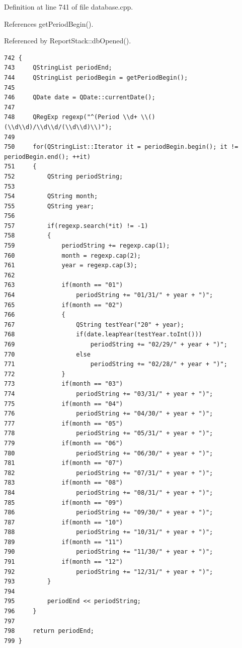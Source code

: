 Definition at line 741 of file database.cpp.

References get\-Period\-Begin().

Referenced by Report\-Stack::db\-Opened().

\footnotesize\begin{verbatim}742 {
743     QStringList periodEnd;
744     QStringList periodBegin = getPeriodBegin();
745     
746     QDate date = QDate::currentDate();
747     
748     QRegExp regexp("^(Period \\d+ \\()(\\d\\d)/\\d\\d/(\\d\\d)\\)");
749     
750     for(QStringList::Iterator it = periodBegin.begin(); it != periodBegin.end(); ++it)
751     {
752         QString periodString;
753         
754         QString month;
755         QString year;
756         
757         if(regexp.search(*it) != -1)
758         {
759             periodString += regexp.cap(1);
760             month = regexp.cap(2);
761             year = regexp.cap(3);
762             
763             if(month == "01")
764                 periodString += "01/31/" + year + ")";
765             if(month == "02")
766             {
767                 QString testYear("20" + year);
768                 if(date.leapYear(testYear.toInt()))
769                     periodString += "02/29/" + year + ")";
770                 else
771                     periodString += "02/28/" + year + ")";
772             }
773             if(month == "03")
774                 periodString += "03/31/" + year + ")";
775             if(month == "04")
776                 periodString += "04/30/" + year + ")";
777             if(month == "05")
778                 periodString += "05/31/" + year + ")";
779             if(month == "06")
780                 periodString += "06/30/" + year + ")";
781             if(month == "07")
782                 periodString += "07/31/" + year + ")";
783             if(month == "08")
784                 periodString += "08/31/" + year + ")";
785             if(month == "09")
786                 periodString += "09/30/" + year + ")";
787             if(month == "10")
788                 periodString += "10/31/" + year + ")";
789             if(month == "11")
790                 periodString += "11/30/" + year + ")";
791             if(month == "12")
792                 periodString += "12/31/" + year + ")";
793         }
794         
795         periodEnd << periodString;
796     }
797     
798     return periodEnd;
799 }
\end{verbatim}\normalsize 


